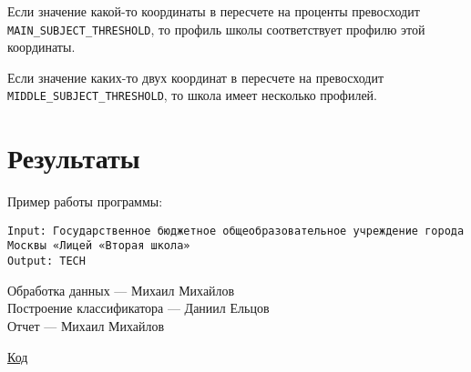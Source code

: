 \documentclass{article}
\begin{document}
Если значение какой-то координаты в пересчете на проценты превосходит 
\texttt{MAIN\_SUBJECT\_THRESHOLD}, то профиль школы соответствует профилю этой координаты. 

Если значение каких-то двух координат в пересчете на превосходит \texttt{MIDDLE\_SUBJECT\_THRESHOLD}, то школа имеет несколько профилей.

\section{Результаты}
Пример работы программы:

\texttt{Input: Государственное бюджетное общеобразовательное учреждение города Москвы «Лицей «Вторая школа»} \\
\texttt{Output: TECH}

Обработка данных --- Михаил Михайлов\\
Построение классификатора --- Даниил Ельцов\\
Отчет --- Михаил Михайлов

\href{https://github.com/Desiment/ml-study/tree/main/classification-tree}{Код}
\end{document}
